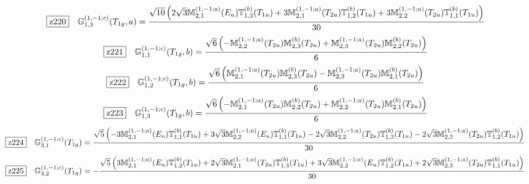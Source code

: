 \documentclass[fleqn,10pt,landscape]{jsarticle}
\begin{document}
\begin{dmath*}
\hspace*{3mm}\fbox{z220}\quad \mathbb{G}_{1,3}^{(1,-1;c)}(T_{1g},a)=\frac{\sqrt{10} \left(2 \sqrt{3} \mathbb{M}_{2,1}^{(1,-1;a)}(E_{u}) \mathbb{T}_{1,3}^{(b)}(T_{1u}) + 3 \mathbb{M}_{2,1}^{(1,-1;a)}(T_{2u}) \mathbb{T}_{1,2}^{(b)}(T_{1u}) + 3 \mathbb{M}_{2,2}^{(1,-1;a)}(T_{2u}) \mathbb{T}_{1,1}^{(b)}(T_{1u})\right)}{30}
\end{dmath*}
\begin{dmath*}
\hspace*{3mm}\fbox{z221}\quad \mathbb{G}_{1,1}^{(1,-1;c)}(T_{1g},b)=\frac{\sqrt{6} \left(- \mathbb{M}_{2,2}^{(1,-1;a)}(T_{2u}) \mathbb{M}_{2,3}^{(b)}(T_{2u}) + \mathbb{M}_{2,3}^{(1,-1;a)}(T_{2u}) \mathbb{M}_{2,2}^{(b)}(T_{2u})\right)}{6}
\end{dmath*}
\begin{dmath*}
\hspace*{3mm}\fbox{z222}\quad \mathbb{G}_{1,2}^{(1,-1;c)}(T_{1g},b)=\frac{\sqrt{6} \left(\mathbb{M}_{2,1}^{(1,-1;a)}(T_{2u}) \mathbb{M}_{2,3}^{(b)}(T_{2u}) - \mathbb{M}_{2,3}^{(1,-1;a)}(T_{2u}) \mathbb{M}_{2,1}^{(b)}(T_{2u})\right)}{6}
\end{dmath*}
\begin{dmath*}
\hspace*{3mm}\fbox{z223}\quad \mathbb{G}_{1,3}^{(1,-1;c)}(T_{1g},b)=\frac{\sqrt{6} \left(- \mathbb{M}_{2,1}^{(1,-1;a)}(T_{2u}) \mathbb{M}_{2,2}^{(b)}(T_{2u}) + \mathbb{M}_{2,2}^{(1,-1;a)}(T_{2u}) \mathbb{M}_{2,1}^{(b)}(T_{2u})\right)}{6}
\end{dmath*}
\begin{dmath*}
\hspace*{3mm}\fbox{z224}\quad \mathbb{G}_{3,1}^{(1,-1;c)}(T_{1g})=\frac{\sqrt{5} \left(- 3 \mathbb{M}_{2,1}^{(1,-1;a)}(E_{u}) \mathbb{T}_{1,1}^{(b)}(T_{1u}) + 3 \sqrt{3} \mathbb{M}_{2,2}^{(1,-1;a)}(E_{u}) \mathbb{T}_{1,1}^{(b)}(T_{1u}) - 2 \sqrt{3} \mathbb{M}_{2,2}^{(1,-1;a)}(T_{2u}) \mathbb{T}_{1,3}^{(b)}(T_{1u}) - 2 \sqrt{3} \mathbb{M}_{2,3}^{(1,-1;a)}(T_{2u}) \mathbb{T}_{1,2}^{(b)}(T_{1u})\right)}{30}
\end{dmath*}
\begin{dmath*}
\hspace*{3mm}\fbox{z225}\quad \mathbb{G}_{3,2}^{(1,-1;c)}(T_{1g})=- \frac{\sqrt{5} \left(3 \mathbb{M}_{2,1}^{(1,-1;a)}(E_{u}) \mathbb{T}_{1,2}^{(b)}(T_{1u}) + 2 \sqrt{3} \mathbb{M}_{2,1}^{(1,-1;a)}(T_{2u}) \mathbb{T}_{1,3}^{(b)}(T_{1u}) + 3 \sqrt{3} \mathbb{M}_{2,2}^{(1,-1;a)}(E_{u}) \mathbb{T}_{1,2}^{(b)}(T_{1u}) + 2 \sqrt{3} \mathbb{M}_{2,3}^{(1,-1;a)}(T_{2u}) \mathbb{T}_{1,1}^{(b)}(T_{1u})\right)}{30}
\end{dmath*}
\end{document}
